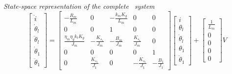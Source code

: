 \noindent \textit{State-space representation of the complete \onedof\ system}
\begin{equation}
	\begin{bmatrix}
		\dot{i} \\
		\dot{\theta}_l \\
		\ddot{\theta}_l \\
		\dot{\theta}_1 \\
		\ddot{\theta}_1
	\end{bmatrix}
	=
	\begin{bmatrix}
		-\frac{R_m}{L_m} & 0 & -\frac{k_m K_g}{L_m} & 0 & 0 \\
		0 & 0 &1 & 0 & 0 \\
		\frac{\eta_m \eta_g k_t K_g}{J_m} & -\frac{K_{s_1}}{J_m} & -\frac{B_m}{J_m} & \frac{K_{s_1}}{J_m} & 0 \\
		0 & 0 & 0 & 0 & 1 \\
		0 & \frac{K_{s_1}}{J_1} & 0 & -\frac{K_{s_1}}{J_1} & -\frac{B_1}{J_1}
	\end{bmatrix}
	\begin{bmatrix}
		i \\
		\theta_l \\
		\dot{\theta}_l \\
		\theta_1 \\
		\dot{\theta}_1
	\end{bmatrix}
	+
	\begin{bmatrix}
		\frac{1}{L_m} \\
		0 \\
		0 \\
		0 \\
		0
	\end{bmatrix}
	V
\end{equation}

